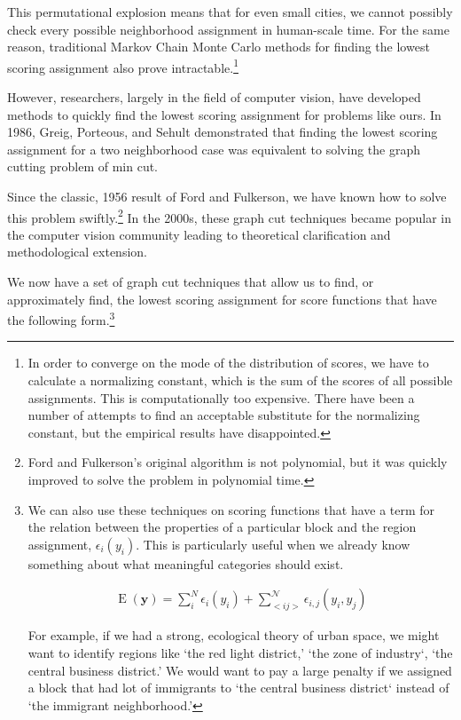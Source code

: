 This permutational explosion means that for even small cities, we
cannot possibly check every possible neighborhood assignment in
human-scale time. For the same reason, traditional Markov Chain Monte
Carlo methods for finding the lowest scoring assignment also prove
intractable.\footnote{In order to converge on the mode of the
  distribution of scores, we have to calculate a normalizing constant,
  which is the sum of the scores of all possible assignments. This is
  computationally too expensive. There have been a number of attempts
  to find an acceptable substitute for the normalizing constant, but
  the empirical results have disappointed.\cite{li_mrf_2009}}

However, researchers, largely in the field of computer vision, have
developed methods to quickly find the lowest scoring assignment for
problems like ours. In 1986, Greig, Porteous, and Sehult demonstrated
that finding the lowest scoring assignment for a two neighborhood case
was equivalent to solving the graph cutting problem of min
cut.\cite{greig_exact_1989}

 Since the classic, 1956 result of Ford and Fulkerson, we have known
 how to solve this problem swiftly.\footnote{Ford and Fulkerson's
   original algorithm is not polynomial, but it was quickly improved
   to solve the problem in polynomial time.\cite{ford_maximal_1956}}
 In the 2000s, these graph cut techniques became popular in the
 computer vision community leading to theoretical
 clarification and methodological extension.\cite{kolmogorov_what_2004}

We now have a set of graph cut techniques that allow us to find, or
approximately find, the lowest scoring assignment for score functions
that have the following form.\footnote{We can also use these
  techniques on scoring functions that have a term for the relation
  between the properties of a particular block and the region
  assignment, $\epsilon_i(y_i)$. This is particularly useful when we
  already know something about what meaningful categories should exist.

  \begin{align}
    \operatorname{E}(\mathbf{y}) = \sum_i^N\epsilon_i(y_i) + \sum_{<i j>}^{\mathcal{N}}\epsilon_{i,j}(y_i,y_j)
  \end{align}

  For example, if we had a strong, ecological theory of urban space,
  we might want to identify regions like `the red light district,'
  `the zone of industry`, `the central business district.' We would
  want to pay a large penalty if we assigned a block that had lot of
  immigrants to `the central business district` instead of `the
  immigrant neighborhood.'
}

